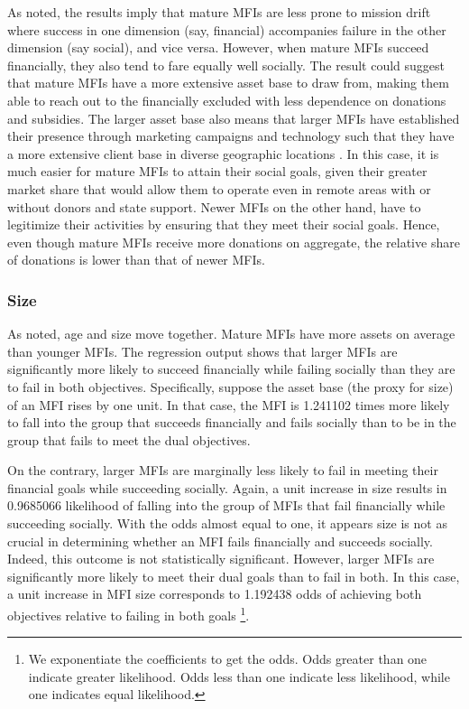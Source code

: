 \documentclass[a4paper, nobind]{templates/ociamthesis}
\begin{document}
As noted, the results imply that mature MFIs are less prone to mission drift where success in one dimension (say, financial) accompanies failure in the other dimension (say social), and vice versa. However, when mature MFIs succeed financially, they also tend to fare equally well socially. The result could suggest that mature MFIs have a more extensive asset base to draw from, making them able to reach out to the financially excluded with less dependence on donations and subsidies. The larger asset base also means that larger MFIs have established their presence through marketing campaigns and technology such that they have a more extensive client base in diverse geographic locations \autocite{jia2016commercialization}. In this case, it is much easier for mature MFIs to attain their social goals, given their greater market share that would allow them to operate even in remote areas with or without donors and state support. Newer MFIs on the other hand, have to legitimize their activities by ensuring that they meet their social goals. Hence, even though mature MFIs receive more donations on aggregate, the relative share of donations is lower than that of newer MFIs.

\hypertarget{size}{%
\subsubsection{Size}\label{size}}

As noted, age and size move together. Mature MFIs have more assets on average than younger MFIs. The regression output shows that larger MFIs are significantly more likely to succeed financially while failing socially than they are to fail in both objectives. Specifically, suppose the asset base (the proxy for size) of an MFI rises by one unit. In that case, the MFI is 1.241102 times more likely to fall into the group that succeeds financially and fails socially than to be in the group that fails to meet the dual objectives.

On the contrary, larger MFIs are marginally less likely to fail in meeting their financial goals while succeeding socially. Again, a unit increase in size results in 0.9685066 likelihood of falling into the group of MFIs that fail financially while succeeding socially. With the odds almost equal to one, it appears size is not as crucial in determining whether an MFI fails financially and succeeds socially. Indeed, this outcome is not statistically significant. However, larger MFIs are significantly more likely to meet their dual goals than to fail in both. In this case, a unit increase in MFI size corresponds to 1.192438 odds of achieving both objectives relative to failing in both goals \footnote{We exponentiate the coefficients to get the odds. Odds greater than one indicate greater likelihood. Odds less than one indicate less likelihood, while one indicates equal likelihood.}.
\end{document}
